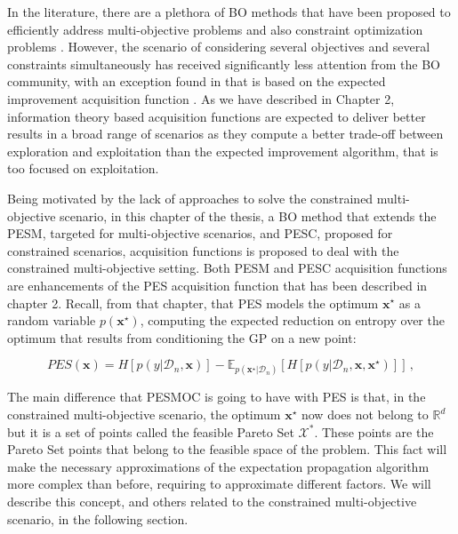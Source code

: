 In the literature, there are a plethora of BO methods that have been proposed to efficiently address multi-objective problems and also constraint optimization problems \citep{knowles2006parego,Emm08,picheny2015multiobjective,hernandez2016predictive,gelbart2014bayesian,hernandez2015predictive,hernandez2016general}. However, the scenario of considering several objectives and several constraints simultaneously has received significantly less attention from the BO community, with an exception found in that is based on the expected improvement acquisition function \citep{feliot2015bayesian}. As we have described in Chapter 2, information theory based acquisition functions are expected to deliver better results in a broad range of scenarios as they compute a better trade-off between exploration and exploitation than the expected improvement algorithm, that is too focused on exploitation.

Being motivated by the lack of approaches to solve the constrained multi-objective scenario, in this chapter of the thesis, a BO method that extends the PESM, targeted for multi-objective scenarios, and PESC, proposed for constrained scenarios, acquisition functions is proposed to deal with the constrained multi-objective setting. Both PESM and PESC acquisition functions are enhancements of the PES acquisition function that has been described in chapter 2. Recall, from that chapter, that PES models the optimum $\mathbf{x}^\star$ as a random variable $p(\mathbf{x}^\star)$, computing the expected reduction on entropy over the optimum that results from conditioning the GP on a new point:

\begin{equation}
PES(\mathbf{x}) = H[p(y|\mathcal{D}_n, \mathbf{x})] - \mathbb{E}_{p(\mathbf{x}^\star|\mathcal{D}_n)}[H[p(y|\mathcal{D}_n,\mathbf{x},\mathbf{x}^\star)]]\,,
\label{eq:pes}
\end{equation}

The main difference that PESMOC is going to have with PES is that, in the constrained multi-objective scenario, the optimum $\mathbf{x}^\star$ now does not belong to $\mathbb{R}^d$ but it is a set of points called the feasible Pareto Set $\mathcal{X}^*$. These points are the Pareto Set points that belong to the feasible space of the problem. This fact will make the necessary approximations of the expectation propagation algorithm more complex than before, requiring to approximate different factors. We will describe this concept, and others related to the constrained multi-objective scenario, in the following section.

